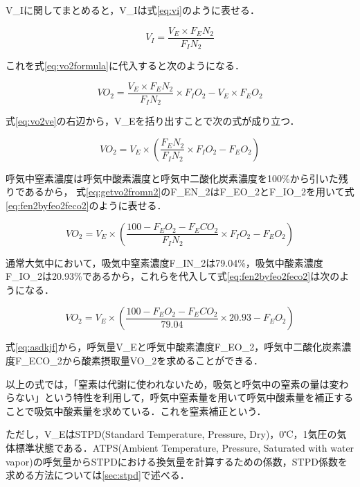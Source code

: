 V_Iに関してまとめると，V_Iは式\ref{eq:vi}のように表せる．

\begin{equation}
  \label{eq:vi}
  V_I = \frac{V_E \times F_EN_2}{F_IN_2}
\end{equation}

これを式\ref{eq:vo2formula}に代入すると次のようになる．

\begin{equation}
  \label{eq:vo2ve}
  VO_2 = \frac{V_E \times F_EN_2}{F_IN_2} \times F_IO_2 - V_E \times F_EO_2
\end{equation}

式\ref{eq:vo2ve}の右辺から，V_Eを括り出すことで次の式が成り立つ．

\begin{equation}
  \label{eq:getvo2fromn2}
  VO_2 = V_E \times (\frac{F_EN_2}{F_IN_2} \times F_IO_2 - F_EO_2)
\end{equation}

呼気中窒素濃度は呼気中酸素濃度と呼気中二酸化炭素濃度を100\%から引いた残りであるから，
式\ref{eq:getvo2fromn2}のF_EN_2はF_EO_2とF_IO_2を用いて式\ref{eq:fen2byfeo2feco2}のように表せる．

\begin{equation}
  \label{eq:fen2byfeo2feco2}
  VO_2 = V_E \times (\frac{100 - F_EO_2 - F_ECO_2}{F_IN_2} \times F_IO_2 - F_EO_2)
\end{equation}

通常大気中において，吸気中窒素濃度F_IN_2は79.04\%，吸気中酸素濃度F_IO_2は20.93\%であるから，これらを代入して式\ref{eq:fen2byfeo2feco2}は次のようになる．

\begin{equation}
  \label{eq:asdkjf}
  VO_2 = V_E \times (\frac{100 - F_EO_2 - F_ECO_2}{79.04} \times 20.93 - F_EO_2)
\end{equation}

式\ref{eq:asdkjf}から，呼気量V_Eと呼気中酸素濃度F_EO_2，呼気中二酸化炭素濃度F_ECO_2から酸素摂取量VO_2を求めることができる．

以上の式では，「窒素は代謝に使われないため，吸気と呼気中の窒素の量は変わらない」という特性を利用して，呼気中窒素量を用いて呼気中酸素量を補正することで吸気中酸素量を求めている．これを窒素補正という．

ただし，V_EはSTPD(Standard Temperature, Pressure, Dry)，0℃，1気圧の気体標準状態である．ATPS(Ambient Temperature, Pressure, Saturated with water vapor)の呼気量からSTPDにおける換気量を計算するための係数，STPD係数を求める方法については\ref{sec:stpd}で述べる．

